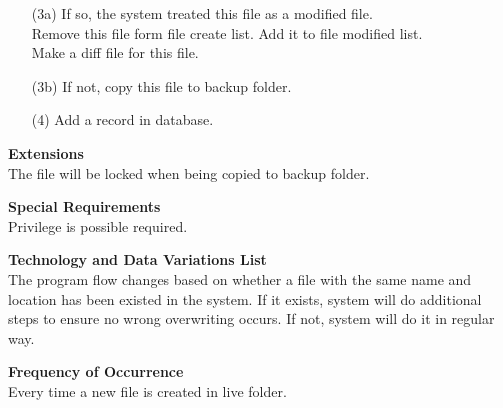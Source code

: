 \documentclass[12pt,a4paper]{article}
\begin{document}
\begin{description}
\begin{itemize}
		\item[(3a)] If so, the system treated this file as a modified file.\\
					Remove this file form file create list. Add it to file modified list.\\
					Make a diff file for this file.
		\item[(3b)] If not, copy this file to backup folder.
		\item[(4)] Add a record in database.
	\end{itemize}
	\item[] \textbf{Extensions} \hfill \\
		The file will be locked when being copied to backup folder.
	\item[] \textbf{Special Requirements}\hfill \\
		Privilege is possible required.
	\item[] \textbf{Technology and Data Variations List}\hfill \\
		The program flow changes based on whether a file with the same name and location has been existed in the system. If it exists, system will do additional steps to ensure no wrong overwriting occurs. If not, system will do it in regular way.
	\item[] \textbf{Frequency of Occurrence}\hfill \\
		Every time a new file is created in live folder.
\end{description}
\end{document}

